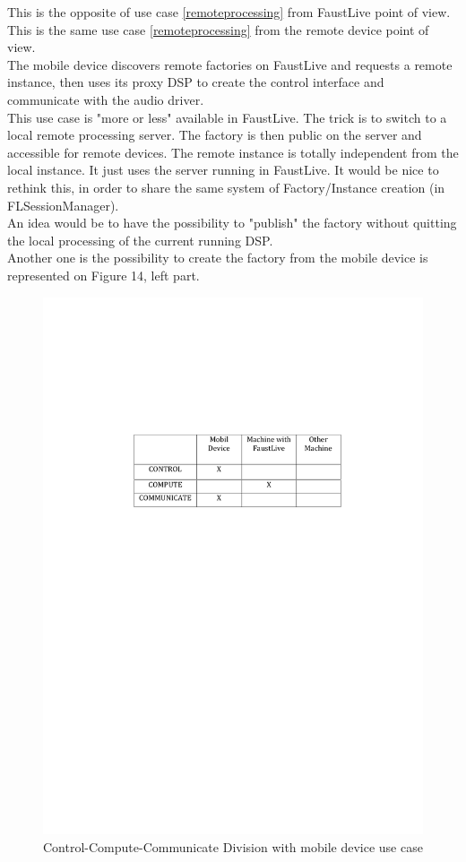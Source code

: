\documentclass[a4paper]{article}
\begin{document}
This is the opposite of use case {\ref {remoteprocessing}} from FaustLive point of view. \\
This is the same use case {\ref {remoteprocessing}} from the remote device point of view. \\

The mobile device discovers remote factories on FaustLive and requests a remote instance, then uses its proxy DSP to create the control interface and communicate with the audio driver. \\
This use case is "more or less" available in FaustLive. The trick is to switch to a local remote processing server. The factory is then public on the server and accessible for remote devices. The remote instance is totally independent from the local instance. It just uses the server running in FaustLive. It would be nice to rethink this, in order to share the same system of Factory/Instance creation (in FLSessionManager). \\

An idea would be to have the possibility to "publish" the factory without quitting the local processing of the current running DSP. \\
Another one is the possibility to create the factory from the mobile device is represented on Figure 14, left part.

\begin{figure}[!h]
\begin{center}
\includegraphics[width=0.7\columnwidth]{images/6CCC}
\caption{Control-Compute-Communicate Division with mobile device use case}
\label{fig:6CCC}
\end{center}
\end{figure}
\end{document}
